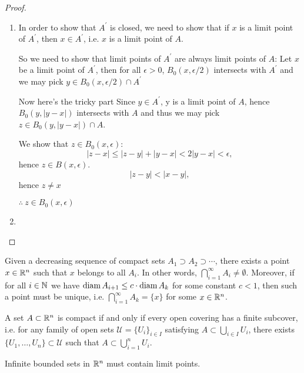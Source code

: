 \begin{proof} \
\begin{enumerate}[label=(\arabic*)]
\item In order to show that $A^\prime$ is closed, we need to show that if $x$ is a limit point of $A^\prime$, then $x\in A^\prime$, i.e. $x$ is a limit point of $A$.

So we need to show that limit points of $A^\prime$ are always limit points of $A$: 
Let $x$ be a limit point of $A^\prime$, then for all $\epsilon>0$, $B_0(x,\epsilon/2)$ intersects with $A^\prime$ and we may pick $y \in B_0(x,\epsilon/2)\cap A^\prime$

Now here's the tricky part
Since $y \in A^\prime$, y is a limit point of $A$, hence $B_0(y,|y-x|)$ intersects with $A$ and thus we may pick $z \in B_0(y,|y-x|)\cap A$.

We show that $z \in B_0(x,\epsilon)$:
\[ |z-x|\le|z-y|+|y-x|<2|y-x|<\epsilon, \]
hence $z \in B(x,\epsilon)$.
\[ |z-y|<|x-y|, \]
hence $z \neq x$

$\therefore\:z \in B_0(x,\epsilon)$

\item 
\end{enumerate}
\end{proof}



\begin{theorem}
Given a decreasing sequence of compact sets $A_1\supset A_2 \supset \cdots$, there exists a point $x\in\mathbb R^n$ such that $x$ belongs to all $A_i$. In other words, $\bigcap_{i=1}^\infty A_i\neq\emptyset$. Moreover, if for all $i\in\mathbb N$ we have $\operatorname{diam} A_{i+1}\le c\cdot\operatorname{diam} A_k$ for some constant $c<1$, then such a point must be unique, i.e. $\bigcap_{i=1}^\infty A_k=\{x\}$ for some $x\in\mathbb R^n$.
\end{theorem}

\begin{theorem}
A set $A\subset\mathbb R^n$ is compact if and only if every open covering has a finite subcover, i.e. for any family of open sets $\mathscr{U}=\{U_i\}_{i\in I}$ satisfying $A\subset\bigcup_{i\in I}U_i$, there exists $\{U_1,\dots,U_n\}\subset\mathscr{U}$ such that $A\subset\bigcup_{i=1}^n U_i$.
\end{theorem}

\begin{theorem}
Infinite bounded sets in $\mathbb R^n$ must contain limit points.
\end{theorem}

